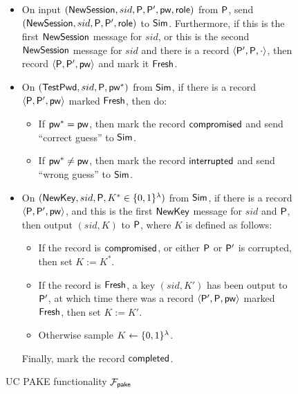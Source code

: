	\begin{figure}[tbp]
		\begin{framed}\small
			\begin{itemize}
				\item On input $(\mathsf{NewSession}, sid, \mathsf{P}, \mathsf{P}', \mathsf{pw}, \mathsf{role})$ from $\mathsf{P}$, send $(\mathsf{NewSession},\allowbreak sid,\allowbreak \mathsf{P},\allowbreak \mathsf{P}',\allowbreak \mathsf{role})$ to $\mathsf{Sim}$. Furthermore, if this is the first $\mathsf{NewSession}$ message for $sid$, or this is the second $\mathsf{NewSession}$ message for $sid$ and there is a record $\left<\mathsf{P}', \mathsf{P}, \cdot\right>$, then record $\left<\mathsf{P}, \mathsf{P}', \mathsf{pw}\right>$ and mark it $\mathsf{Fresh}$.
				\item On $(\mathsf{TestPwd}, sid, \mathsf{P}, \mathsf{pw}^*)$ from $\mathsf{Sim}$, if there is a record $\left<\mathsf{P}, \mathsf{P}', \mathsf{pw}\right>$ marked $\mathsf{Fresh}$, then do:
				\begin{itemize}
					\item If $\mathsf{pw}^* = \mathsf{pw}$, then mark the record $\mathsf{compromised}$ and send ``correct guess'' to $\mathsf{Sim}$.
					\item If $\mathsf{pw}^* \neq \mathsf{pw}$, then mark the record $\mathsf{interrupted}$ and send ``wrong guess'' to $\mathsf{Sim}$.
				\end{itemize}
				\item On $(\mathsf{NewKey}, sid, \mathsf{P}, K^* \in \{0,1\}^\lambda)$ from $\mathsf{Sim}$, if there is a record $\left<\mathsf{P}, \mathsf{P}', \mathsf{pw}\right>$, and this is the first $\mathsf{NewKey}$ message for $sid$ and $\mathsf{P}$, then output $(sid, K)$ to $\mathsf{P}$, where $K$ is defined as follows:
				\begin{itemize}
					\item If the record is $\mathsf{compromised}$, or either $\mathsf{P}$ or $\mathsf{P}'$ is corrupted, then set $K := K^*$.
					\item If the record is $\mathsf{Fresh}$, a key $(sid, K')$ has been output to $\mathsf{P}'$, at which time there was a record $\left<\mathsf{P}', \mathsf{P}, \mathsf{pw}\right>$ marked $\mathsf{Fresh}$, then set $K := K'$.
					\item Otherwise sample $K \gets \{0,1\}^\lambda$.
				\end{itemize}
				Finally, mark the record $\mathsf{completed}$.
			\end{itemize}
		\end{framed}
		\caption{UC PAKE functionality $\mathcal{F}_{\mathsf{pake}}$}
		\label{fig:pake-functionality}
	\end{figure}
	
	
	
	
	
	
	
%			
